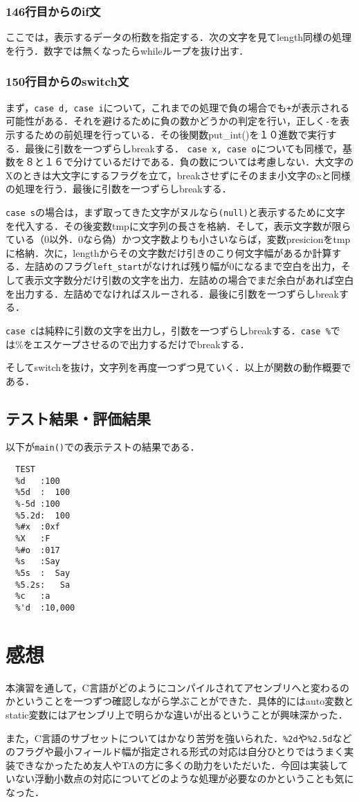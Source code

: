 \documentclass[a4j,11pt]{jarticle}
\begin{document}
\subsubsection{146行目からのif文}
ここでは，表示するデータの桁数を指定する．次の文字を見てlength同様の処理を行う．数字では無くなったらwhileループを抜け出す．

\subsubsection{150行目からのswitch文}
まず，\verb|case d, case i|について，これまでの処理で負の場合でも\texttt{+}が表示される可能性がある．それを避けるために負の数かどうかの判定を行い，正しく\texttt{-}を表示するための前処理を行っている．その後関数put\_int()を１０進数で実行する．最後に引数を一つずらしbreakする．
\verb|case x, case o|についても同様で，基数を８と１６で分けているだけである．負の数については考慮しない．大文字のXのときは大文字にするフラグを立て，breakさせずにそのまま小文字のxと同様の処理を行う．最後に引数を一つずらしbreakする．

\verb|case s|の場合は，まず取ってきた文字がヌルなら\verb|(null)|と表示するために文字を代入する．その後変数tmpに文字列の長さを格納．そして，表示文字数が限らている（0以外．0なら偽）かつ文字数よりも小さいならば，変数presicionをtmpに格納．次に，lengthからその文字数だけ引きのこり何文字幅があるか計算する．左詰めのフラグ\verb|left_start|がなければ残り幅が0になるまで空白を出力，そして表示文字数分だけ引数の文字を出力．左詰めの場合でまだ余白があれば空白を出力する．左詰めでなければスルーされる．最後に引数を一つずらしbreakする．

\verb|case c|は純粋に引数の文字を出力し，引数を一つずらしbreakする．\verb|case %|では\%をエスケープさせるので出力するだけでbreakする．

そしてswitchを抜け，文字列を再度一つずつ見ていく．以上が関数の動作概要である．
  \subsection{テスト結果・評価結果}
以下が\verb|main()|での表示テストの結果である．
\begin{verbatim}
  TEST
  %d   :100
  %5d  :  100
  %-5d :100
  %5.2d:  100
  %#x  :0xf
  %X   :F
  %#o  :017
  %s   :Say
  %5s  :  Say
  %5.2s:   Sa
  %c   :a
  %'d  :10,000
\end{verbatim}

\section{感想}
本演習を通して，C言語がどのようにコンパイルされてアセンブリへと変わるのかということを一つずつ確認しながら学ぶことができた．具体的にはauto変数とstatic変数にはアセンブリ上で明らかな違いが出るということが興味深かった．

また，C言語のサブセットについてはかなり苦労を強いられた．\verb|%2d|や\verb|%2.5d|などのフラグや最小フィールド幅が指定される形式の対応は自分ひとりではうまく実装できなかったため友人やTAの方に多くの助力をいただいた．今回は実装していない浮動小数点の対応についてどのような処理が必要なのかということも気になった．
\end{document}
